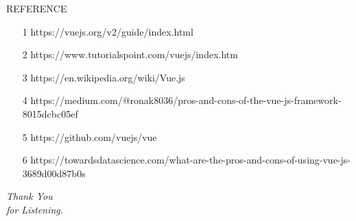 \documentclass[aspectratio=169, 169]{beamer}
\begin{document}
\begin{frame}{REFERENCE}
    \begin{itemize}
        \item [1] https://vuejs.org/v2/guide/index.html
        \item [2] https://www.tutorialspoint.com/vuejs/index.htm
        \item [3] https://en.wikipedia.org/wiki/Vue.js
        \item [4] https://medium.com/@ronak8036/pros-and-cons-of-the-vue-js-framework-8015dcbc05ef
        \item [5] https://github.com/vuejs/vue
        \item [6] https://towardsdatascience.com/what-are-the-pros-and-cons-of-using-vue-js-3689d00d87b0s

    \end{itemize}
\end{frame}
\begin{frame}
\centering \Huge
\emph{Thank You\\for Listening.}
\end{frame}
\end{document}
